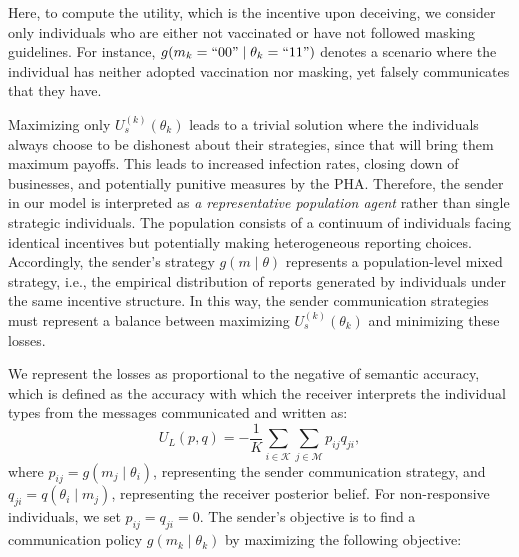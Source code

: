 \documentclass[sigconf,review]{acmart}
\begin{document}

Here, to compute the utility, which is the incentive upon deceiving, we consider only individuals who are either not vaccinated or have not followed masking guidelines. For instance, \( g(m_k = ``00" \mid \theta_k=``11") \) denotes a scenario where the individual has neither adopted vaccination nor masking, yet falsely communicates that they have. 

Maximizing only $U_s^{(k)}(\theta_k)$ leads to a trivial solution where the individuals always choose to be dishonest about their strategies, since that will bring them maximum payoffs. %
This leads to increased infection rates, closing down of businesses, and potentially punitive measures by the PHA.
Therefore, the sender in our model is interpreted as \emph{a representative population agent} rather than single strategic individuals. The population consists of a continuum of individuals facing identical incentives but potentially making heterogeneous reporting choices. Accordingly, the sender's strategy $g(m \mid \theta)$ represents a population-level mixed strategy, i.e., the empirical distribution of reports generated by individuals under the same incentive structure. In this way, the sender communication strategies must represent a balance between maximizing $U_s^{(k)}(\theta_k)$ and minimizing these losses. 

We represent the losses as proportional to the negative of semantic accuracy, which is defined as the accuracy with which the receiver interprets the individual types from the messages communicated and written as:
\begin{equation}
U_L(p, q) = -\frac{1}{K} \sum\limits_{i \in \mathcal{K}} \sum\limits_{j \in \mathcal{M}} p_{ij} q_{ji},
\end{equation}
where $p_{ij} = g(m_j \mid \theta_i)$, representing the sender communication strategy, and $q_{ji} = q(\theta_i \mid m_j)$, representing the receiver posterior belief. For non-responsive individuals, we set $p_{ij} = q_{ji} = 0$.
The sender's objective is to find a communication policy $g(m_k \mid \theta_k)$ by maximizing the following objective:
\end{document}
